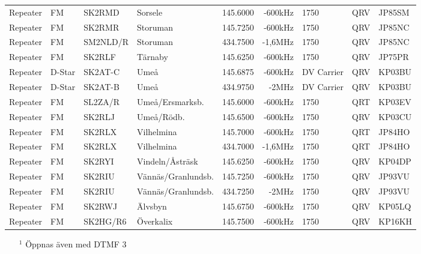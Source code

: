 \begin{landscape}
\begin{longtable}{llllrrlcl}
	Repeater          & FM           & SK2RMD        & Sorsele            &          145.6000 &        -600kHz & 1750             &       QRV       & JP85SM           \\
	Repeater          & FM           & SK2RMR        & Storuman           &          145.7250 &        -600kHz & 1750             &       QRV       & JP85NC           \\
	Repeater          & FM           & SM2NLD/R      & Storuman           &          434.7500 &        -1,6MHz & 1750             &       QRV       & JP85NC           \\
	Repeater          & FM           & SK2RLF        & Tärnaby            &          145.6250 &        -600kHz & 1750             &       QRV       & JP75PR           \\
	Repeater          & D-Star       & SK2AT-C       & Umeå               &          145.6875 &        -600kHz & DV Carrier       &       QRV       & KP03BU           \\
	Repeater          & D-Star       & SK2AT-B       & Umeå               &          434.9750 &          -2MHz & DV Carrier       &       QRV       & KP03BU           \\
	Repeater          & FM           & SL2ZA/R       & Umeå/Ersmarksb.    &          145.6000 &        -600kHz & 1750             &       QRT       & KP03EV           \\
	Repeater          & FM           & SK2RLJ        & Umeå/Rödb.         &          145.6500 &        -600kHz & 1750             &       QRV       & KP03CU           \\
	Repeater          & FM           & SK2RLX        & Vilhelmina         &          145.7000 &        -600kHz & 1750             &       QRT       & JP84HO           \\
	Repeater          & FM           & SK2RLX        & Vilhelmina         &          434.7000 &        -1,6MHz & 1750             &       QRT       & JP84HO           \\
	Repeater          & FM           & SK2RYI        & Vindeln/Åsträsk    &          145.6250 &        -600kHz & 1750             &       QRV       & KP04DP           \\
	Repeater          & FM           & SK2RIU        & Vännäs/Granlundsb. &          145.7250 &        -600kHz & 1750             &       QRV       & JP93VU           \\
	Repeater          & FM           & SK2RIU        & Vännäs/Granlundsb. &          434.7250 &          -2MHz & 1750             &       QRV       & JP93VU           \\
	Repeater          & FM           & SK2RWJ        & Älvsbyn            &          145.6750 &        -600kHz & 1750             &       QRV       & KP05LQ           \\
	Repeater          & FM           & SK2HG/R6      & Överkalix          &          145.7500 &        -600kHz & 1750             &       QRV       & KP16KH
\end{longtable}
\begin{itemize}
	\item[$^1$] Öppnas även med DTMF 3
\end{itemize}
\normalsize

\end{landscape}
